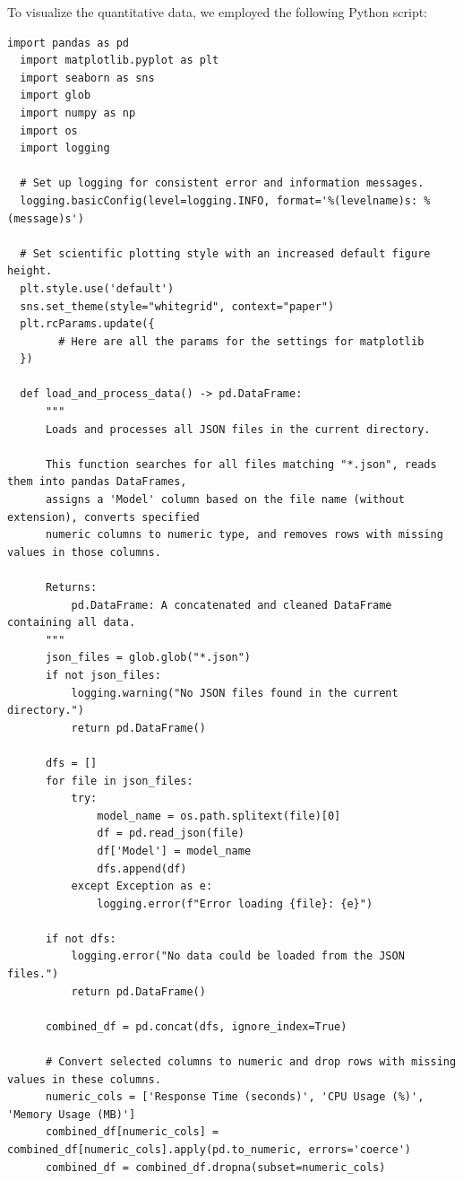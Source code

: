 To visualize the quantitative data, we employed the following Python script:


\begin{lstlisting}[style=Python, caption={Python-quantitative-data-analysis}, captionpos=b]
  import pandas as pd
  import matplotlib.pyplot as plt
  import seaborn as sns
  import glob
  import numpy as np
  import os
  import logging
  
  # Set up logging for consistent error and information messages.
  logging.basicConfig(level=logging.INFO, format='%(levelname)s: %(message)s')
  
  # Set scientific plotting style with an increased default figure height.
  plt.style.use('default')
  sns.set_theme(style="whitegrid", context="paper")
  plt.rcParams.update({
        # Here are all the params for the settings for matplotlib
  })
  
  def load_and_process_data() -> pd.DataFrame:
      """
      Loads and processes all JSON files in the current directory.
      
      This function searches for all files matching "*.json", reads them into pandas DataFrames,
      assigns a 'Model' column based on the file name (without extension), converts specified
      numeric columns to numeric type, and removes rows with missing values in those columns.
      
      Returns:
          pd.DataFrame: A concatenated and cleaned DataFrame containing all data.
      """
      json_files = glob.glob("*.json")
      if not json_files:
          logging.warning("No JSON files found in the current directory.")
          return pd.DataFrame()
      
      dfs = []
      for file in json_files:
          try:
              model_name = os.path.splitext(file)[0]
              df = pd.read_json(file)
              df['Model'] = model_name
              dfs.append(df)
          except Exception as e:
              logging.error(f"Error loading {file}: {e}")
      
      if not dfs:
          logging.error("No data could be loaded from the JSON files.")
          return pd.DataFrame()
      
      combined_df = pd.concat(dfs, ignore_index=True)
      
      # Convert selected columns to numeric and drop rows with missing values in these columns.
      numeric_cols = ['Response Time (seconds)', 'CPU Usage (%)', 'Memory Usage (MB)']
      combined_df[numeric_cols] = combined_df[numeric_cols].apply(pd.to_numeric, errors='coerce')
      combined_df = combined_df.dropna(subset=numeric_cols)
      

\end{lstlisting}
